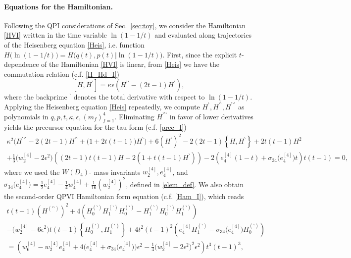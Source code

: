 \documentclass[12pt,a4paper]{article}
\numberwithin{equation}{section}
\begin{document}
\paragraph{Equations for the Hamiltonian.}
Following the QPI considerations of  Sec.~\ref{sec:toy}, we consider the Hamiltonian \eqref{HVI} written in the time variable $\ln(1{-}1/t)$ and evaluated along trajectories of the Heisenberg equation \eqref{Heis}, i.e. function  
$H\big(\ln(1{-}1/t)\big)=H\big(q(t),p(t)|\ln(1{-}1/t)\big)$. First, since the explicit $t$-dependence of the Hamiltonian \eqref{HVI} is linear, from \eqref{Heis} we have the commutation relation (c.f. \eqref{H_Hd_I})
\begin{equation}\label{H_Hd_VI}
[H,H^\backprime]=\kappa\epsilon\left(H^{\backprime\backprime}-(2t{-}1) H^{\backprime}\right),
\end{equation}
where the backprime $^\backprime$ denotes the total derivative with respect to $\ln(1{-}1/t)$.
Applying the Heisenberg equation \eqref{Heis} repeatedly, we compute $H^\backprime,H^{\backprime\backprime},H^{\backprime\backprime\backprime}$ as polynomials in $q,p,t,\kappa,\epsilon,(m_f)_{f=1}^4$. Eliminating $H^{\backprime\backprime\backprime}$ in favor of lower derivatives yields the precursor equation for the tau form (c.f. \eqref{prec_I}) 
\begin{multline}\label{prec_VI}
\kappa^2\Big(H^{\backprime\backprime\backprime}-2(2t{-}1)H^{\backprime\backprime}+\big(1{+}2t(t{-}1)\big)H^\backprime\Big)+6(H^\backprime)^2-2(2t{-}1)\left\{H,H^\backprime\right\}+2t(t{-}1)H^2\\+\frac13\big(w_2^{[4]}{-}2\epsilon^2\big)\left((2t{-}1)t(t{-}1)H-2(1{+}t(t{-}1)H^\backprime)\right)-2\left(e_4^{[4]}(1{-}t){+}\sigma_{34}\big(e_4^{[4]}\big)t\right)t(t{-}1)=0, 
\end{multline} 
where we used the $W(D_4)$- mass invariants $w_2^{[4]},e_4^{[4]}$, and $\sigma_{34}\big(e_4^{[4]}\big)=\frac12e_4^{[4]}{-}\frac14w_4^{[4]}{+}\frac1{16}(w_2^{[4]})^2$, defined in  \eqref{elem_def}.
We also obtain the second-order QPVI Hamiltonian form equation (c.f. \eqref{Ham_I}), which reads
\begin{multline}\label{Ham_VI}
t(t{-}1)\left(H^{(\backprime\backprime)}\right)^2+4\left(H^{(\backprime)}_0H^{(\backprime)}_1H^{(\backprime)}_0-H^{(\backprime)}_1H^{(\backprime)}_0H^{(\backprime)}_1\right)\\-\big(w_2^{[4]}{-}6\epsilon^2\big)t(t{-}1)\left\{H^{(\backprime)}_0,H^{(\backprime)}_1\right\}
+4t^2(t{-}1)^2\left(e_4^{[4]}H^{(\backprime)}_1-\sigma_{34}\big(e_4^{[4]}\big)H^{(\backprime)}_0\right)
\\=\left(w_6^{[4]}-w_2^{[4]}e_4^{[4]}+4\Big(e_4^{[4]}{+}\sigma_{34}\big(e_4^{[4]}\big)\Big)\epsilon^2-\frac14\big(w_2^{[4]}{-}2\epsilon^2\big)^2\epsilon^2\right)t^3(t{-}1)^3, 
\end{multline}
\end{document}
